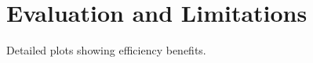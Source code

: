 
\section{Evaluation and Limitations}
\label{sec:eval}

Detailed plots showing efficiency benefits. 

